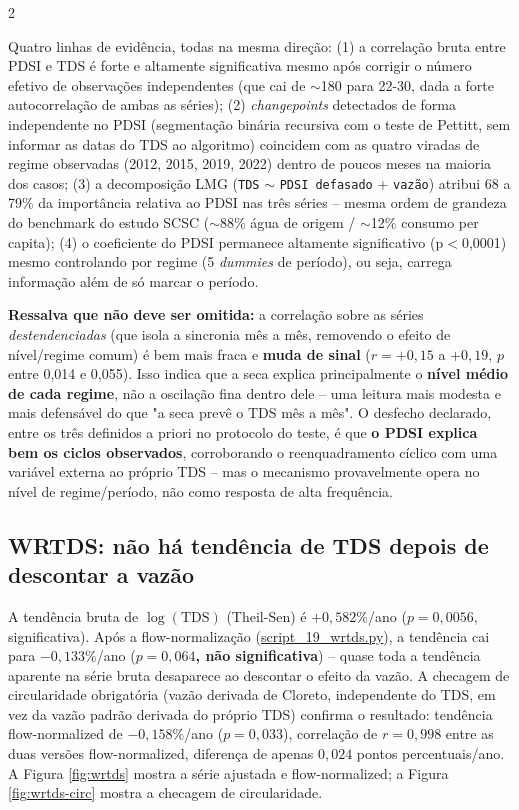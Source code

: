\begin{multicols*}{2}

Quatro linhas de evidência, todas na mesma direção: (1) a correlação bruta entre PDSI e TDS é forte e altamente significativa mesmo após corrigir o número efetivo de observações independentes (que cai de $\sim$180 para 22-30, dada a forte autocorrelação de ambas as séries); (2) \textit{changepoints} detectados de forma independente no PDSI (segmentação binária recursiva com o teste de Pettitt, sem informar as datas do TDS ao algoritmo) coincidem com as quatro viradas de regime observadas (2012, 2015, 2019, 2022) dentro de poucos meses na maioria dos casos; (3) a decomposição LMG (\texttt{TDS} $\sim$ \texttt{PDSI defasado} + \texttt{vazão}) atribui 68 a 79\% da importância relativa ao PDSI nas três séries -- mesma ordem de grandeza do benchmark do estudo SCSC ($\sim$88\% água de origem / $\sim$12\% consumo per capita); (4) o coeficiente do PDSI permanece altamente significativo (p$<$0,0001) mesmo controlando por regime (5 \textit{dummies} de período), ou seja, carrega informação além de só marcar o período.

\textbf{Ressalva que não deve ser omitida:} a correlação sobre as séries \textit{destendenciadas} (que isola a sincronia mês a mês, removendo o efeito de nível/regime comum) é bem mais fraca e \textbf{muda de sinal} ($r=+0{,}15$ a $+0{,}19$, $p$ entre 0,014 e 0,055). Isso indica que a seca explica principalmente o \textbf{nível médio de cada regime}, não a oscilação fina dentro dele -- uma leitura mais modesta e mais defensável do que "a seca prevê o TDS mês a mês". O desfecho declarado, entre os três definidos a priori no protocolo do teste, é que \textbf{o PDSI explica bem os ciclos observados}, corroborando o reenquadramento cíclico com uma variável externa ao próprio TDS -- mas o mecanismo provavelmente opera no nível de regime/período, não como resposta de alta frequência.

\subsection{WRTDS: não há tendência de TDS depois de descontar a vazão}

A tendência bruta de $\log(\mathrm{TDS})$ (Theil-Sen) é $+0{,}582\%$/ano ($p=0{,}0056$, significativa). Após a flow-normalização (\url{script_19_wrtds.py}), a tendência cai para $-0{,}133\%$/ano (\textbf{$p=0{,}064$, não significativa}) -- quase toda a tendência aparente na série bruta desaparece ao descontar o efeito da vazão. A checagem de circularidade obrigatória (vazão derivada de Cloreto, independente do TDS, em vez da vazão padrão derivada do próprio TDS) confirma o resultado: tendência flow-normalized de $-0{,}158\%$/ano ($p=0{,}033$), correlação de $r=0{,}998$ entre as duas versões flow-normalized, diferença de apenas $0{,}024$ pontos percentuais/ano. A Figura \ref{fig:wrtds} mostra a série ajustada e flow-normalized; a Figura \ref{fig:wrtds-circ} mostra a checagem de circularidade.


\end{multicols*}
